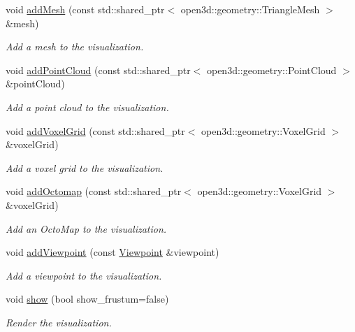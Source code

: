 \begin{DoxyCompactItemize}
void \hyperlink{classvisioncraft_1_1Visualizer_a080245b7fcadd64909d789bbdf7e8197}{add\+Mesh} (const std\+::shared\+\_\+ptr$<$ open3d\+::geometry\+::\+Triangle\+Mesh $>$ \&mesh)
\begin{DoxyCompactList}\small\item\em Add a mesh to the visualization. \end{DoxyCompactList}\item 
void \hyperlink{classvisioncraft_1_1Visualizer_a7e36fb4fdc5aadc474b5163e6a53f921}{add\+Point\+Cloud} (const std\+::shared\+\_\+ptr$<$ open3d\+::geometry\+::\+Point\+Cloud $>$ \&point\+Cloud)
\begin{DoxyCompactList}\small\item\em Add a point cloud to the visualization. \end{DoxyCompactList}\item 
void \hyperlink{classvisioncraft_1_1Visualizer_ac5b2f4098c87ecad3bb14f47a8a9d6b9}{add\+Voxel\+Grid} (const std\+::shared\+\_\+ptr$<$ open3d\+::geometry\+::\+Voxel\+Grid $>$ \&voxel\+Grid)
\begin{DoxyCompactList}\small\item\em Add a voxel grid to the visualization. \end{DoxyCompactList}\item 
void \hyperlink{classvisioncraft_1_1Visualizer_a69a0d51b72b3fca0092577083557a9e6}{add\+Octomap} (const std\+::shared\+\_\+ptr$<$ open3d\+::geometry\+::\+Voxel\+Grid $>$ \&voxel\+Grid)
\begin{DoxyCompactList}\small\item\em Add an Octo\+Map to the visualization. \end{DoxyCompactList}\item 
void \hyperlink{classvisioncraft_1_1Visualizer_aa5fd7bbbb5ffb77dd69c171faaab6888}{add\+Viewpoint} (const \hyperlink{classvisioncraft_1_1Viewpoint}{Viewpoint} \&viewpoint)
\begin{DoxyCompactList}\small\item\em Add a viewpoint to the visualization. \end{DoxyCompactList}\item 
void \hyperlink{classvisioncraft_1_1Visualizer_a2b6d296697a212964b2883aefbf76c49}{show} (bool show\+\_\+frustum=false)
\begin{DoxyCompactList}\small\item\em Render the visualization. \end{DoxyCompactList}\end{DoxyCompactItemize}


